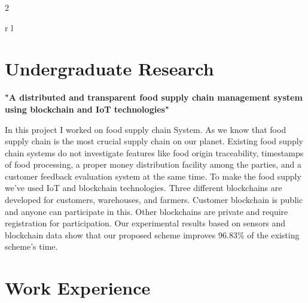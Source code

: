 \documentclass[
	10pt, %
]{RESUME}
\begin{document}
\begin{paracol}{2}
\begin{supertabular}{r l}
	\end{supertabular}





	\section{Undergraduate Research}

	 {\raggedright\textbf{"A distributed and transparent food supply chain management system using blockchain and IoT technologies"}\par}

	\medskip %
	In this project I worked on food supply chain System. As we know that food supply chain
	is the most crucial supply chain on our planet. Existing food supply
	chain systems do not investigate features like food origin traceability, timestamps of food
	processing, a proper money distribution facility among the parties, and a customer feedback
	evaluation system at the same time. To make the food supply we've used IoT and
	blockchain technologies. Three different blockchains
	are developed for customers, warehouses, and farmers. Customer blockchain is public and
	anyone can participate in this. Other blockchains are private and require registration for
	participation. Our experimental results based on sensors and blockchain data show that our
	proposed scheme improves 96.83\% of the existing scheme's time.
	\medskip %


	\section{Work Experience}





\end{paracol}
\end{document}
